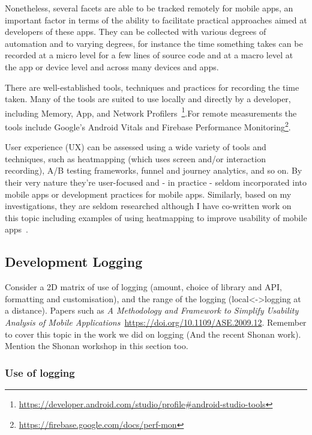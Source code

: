 Nonetheless, several facets are able to be tracked remotely for mobile apps, an important factor in terms of the ability to facilitate practical approaches aimed at developers of these apps. They can be collected with various degrees of automation and to varying degrees, for instance the time something takes can be recorded at a micro level for a few lines of source code and at a macro level at the app or device level and across many devices and apps. 

There are well-established tools, techniques and practices for recording the time taken. Many of the tools are suited to use locally and directly by a developer, including Memory, App, and Network Profilers~\footnote{\url{https://developer.android.com/studio/profile\#android-studio-tools}}.For remote measurements the tools include Google's Android Vitals and Firebase Performance Monitoring\footnote{\url{https://firebase.google.com/docs/perf-mon}}.

User experience (UX) can be assessed using a wide variety of tools and techniques, such as heatmapping (which uses screen and/or interaction recording), A/B testing frameworks, funnel and journey analytics, and so on. By their very nature they're user-focused and - in practice - seldom incorporated into mobile apps or development practices for mobile apps. Similarly, based on my investigations, they are seldom researched although I have co-written work on this topic including examples of using heatmapping to improve usability of mobile apps~\cite{harty_aymer_playbook_2016}.

\subsection{Development Logging}
Consider a 2D matrix of use of logging (amount, choice of library and API, formatting and customisation), and the range of the logging (local<->logging at a distance). Papers such as \emph{A Methodology and Framework to Simplify Usability Analysis of Mobile Applications}~\url{https://doi.org/10.1109/ASE.2009.12}. Remember to cover this topic in the work we did on logging (And the recent Shonan work). Mention the Shonan workshop in this section too.

\subsubsection{Use of logging}

